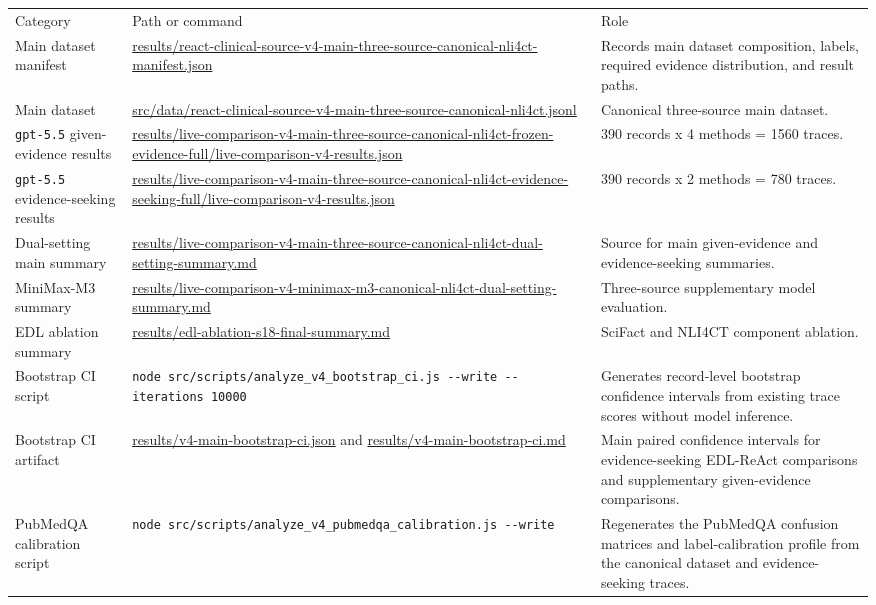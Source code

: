 \documentclass[
  8pt,
]{extarticle}
\begin{document}
\begin{center}
\begin{adjustbox}{max width=0.95\textwidth}
\begin{tabular}{@{}
lll@{}}
\toprule\noalign{}
Category & Path or command & Role \\

Main dataset manifest &
\url{results/react-clinical-source-v4-main-three-source-canonical-nli4ct-manifest.json}
& Records main dataset composition, labels, required evidence
distribution, and result paths. \\
Main dataset &
\url{src/data/react-clinical-source-v4-main-three-source-canonical-nli4ct.jsonl}
& Canonical three-source main dataset. \\
\texttt{gpt-5.5} given-evidence results &
\url{results/live-comparison-v4-main-three-source-canonical-nli4ct-frozen-evidence-full/live-comparison-v4-results.json}
& 390 records x 4 methods = 1560 traces. \\
\texttt{gpt-5.5} evidence-seeking results &
\url{results/live-comparison-v4-main-three-source-canonical-nli4ct-evidence-seeking-full/live-comparison-v4-results.json}
& 390 records x 2 methods = 780 traces. \\
Dual-setting main summary &
\url{results/live-comparison-v4-main-three-source-canonical-nli4ct-dual-setting-summary.md}
& Source for main given-evidence and evidence-seeking summaries. \\
MiniMax-M3 summary &
\url{results/live-comparison-v4-minimax-m3-canonical-nli4ct-dual-setting-summary.md}
& Three-source supplementary model evaluation. \\
EDL ablation summary &
\url{results/edl-ablation-s18-final-summary.md} &
SciFact and NLI4CT component ablation. \\
Bootstrap CI script &
\texttt{node\ src/scripts/analyze\_v4\_bootstrap\_ci.js\ -\/-write\ -\/-iterations\ 10000}
& Generates record-level bootstrap confidence intervals from existing
trace scores without model inference. \\
Bootstrap CI artifact & \url{results/v4-main-bootstrap-ci.json} and
\url{results/v4-main-bootstrap-ci.md} & Main paired confidence
intervals for evidence-seeking EDL-ReAct comparisons and supplementary
given-evidence comparisons. \\
PubMedQA calibration script &
\texttt{node\ src/scripts/analyze\_v4\_pubmedqa\_calibration.js\ -\/-write}
& Regenerates the PubMedQA confusion matrices and label-calibration
profile from the canonical dataset and evidence-seeking traces. \\

\end{tabular}
\end{adjustbox}
\end{center}
\end{document}
